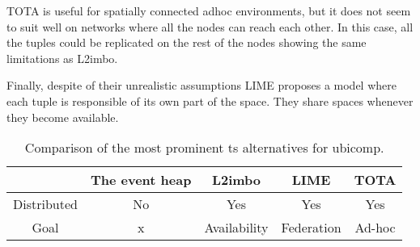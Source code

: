 TOTA is useful for spatially connected adhoc environments, but it does not seem to suit well on networks where all the nodes can reach each other.
In this case, all the tuples could be replicated on the rest of the nodes showing the same limitations as L2imbo.%

Finally, despite of their unrealistic assumptions LIME proposes a model where each tuple is responsible of its own part of the space.
They share spaces whenever they become available.


\begin{table}%
  \centering
  \begin{tabular}{c|cccc}%
      ~ & The event heap & L2imbo & LIME & TOTA \\
      \hline
      \hline
      Distributed & No & Yes & Yes & Yes \\
      Goal & x & Availability & Federation & Ad-hoc \\
  \end{tabular}
  \caption{Comparison of the most prominent \acl{ts} alternatives for \acl{ubicomp}.} %
  \label{tab:myfirsttable}
\end{table}